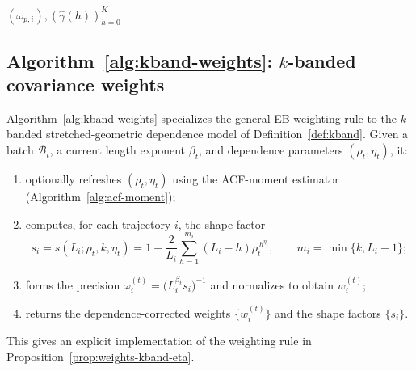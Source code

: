 \begin{algorithm}
\DontPrintSemicolon
\caption{CAPO-HAC plug-in: Newey--West induced-variance estimation and precisions}
\label{alg:capo-hac}


\Return $(\omega_{p,i}),(\widehat\gamma(h))_{h=0}^{K}$\;
\end{algorithm}

\subsection{Algorithm~\ref{alg:kband-weights}: \texorpdfstring{$k$}{k}-banded covariance weights}
Algorithm~\ref{alg:kband-weights} specializes the general EB weighting rule to the $k$-banded stretched-geometric dependence model of Definition~\ref{def:kband}.
Given a batch \(\mathcal B_t\), a current length exponent \(\beta_t\), and dependence parameters \((\rho_t,\eta_t)\), it:
\begin{enumerate}
  \item optionally refreshes \((\rho_t,\eta_t)\) using the ACF-moment estimator (Algorithm~\ref{alg:acf-moment});
  \item computes, for each trajectory \(i\), the shape factor
  \[
  s_i = s(L_i;\rho_t,k,\eta_t)
  = 1 + \frac{2}{L_i}\sum_{h=1}^{m_i} (L_i-h)\rho_t^{\,h^{\eta_t}},
  \qquad m_i=\min\{k,L_i-1\};
  \]
  \item forms the precision \(\omega_i^{(t)} = \big(L_i^{\beta_t} s_i\big)^{-1}\) and normalizes to obtain \(w_i^{(t)}\);
  \item returns the dependence-corrected weights \(\{w_i^{(t)}\}\) and the shape factors \(\{s_i\}\).
\end{enumerate}
This gives an explicit implementation of the weighting rule in Proposition~\ref{prop:weights-kband-eta}.

